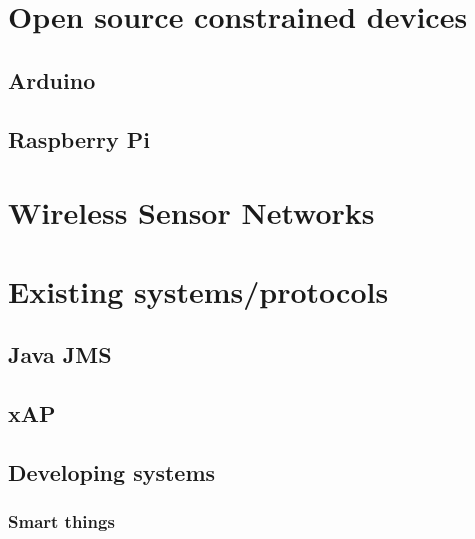 \documentclass{l4proj}
\begin{document}
\section{Open source constrained devices} %
\label{sec:open_source_constrained_devices}
\subsection{Arduino} %
\label{sub:arduino}


\subsection{Raspberry Pi} %
\label{sub:raspberry_pi}

\section{Wireless Sensor Networks} %
\label{sec:wireless_sensor_networks}


\section{Existing systems/protocols} %
\label{sec:existing_systems_protocols}

\subsection{Java JMS} %
\label{sub:java_jms}


\subsection{xAP} %
\label{sub:xap}
\cite{xAP}

\subsection{Developing systems} %
\label{sub:developing_systems}

\subsubsection{Smart things} %
\label{ssub:smart_things}
\end{document}
